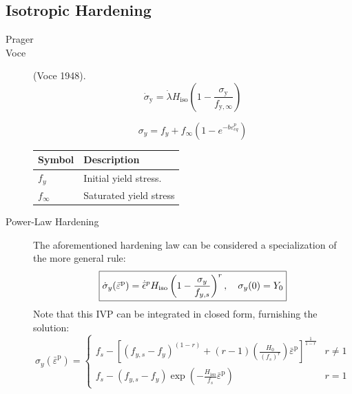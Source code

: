 \hypertarget{isotropic-hardening}{%
\subsection{Isotropic Hardening}\label{isotropic-hardening}}
\begin{description}
\item[Prager]



\item[Voce] (Voce 1948). 
  \[
  \boxed{
  \dot{\sigma}_\text{y} = \dot{\lambda} H_\text{iso}\left(1-\frac{\sigma_\text{y}}{f_{\text{y}, \infty}}\right)
  }
  \] 

\[
\sigma_{y} = f_{y} + f_{\infty}\left(1-e^{-b \varepsilon_{e q}^{p}}\right)
\]

\begin{longtable}[]{@{}ll@{}}
\toprule\noalign{}
Symbol & Description \\
\midrule\noalign{}
\endhead
\bottomrule\noalign{}
\endlastfoot
\(f_y\) & Initial yield stress. \\
\(f_\infty\) & Saturated yield stress \\
\end{longtable}


\item[Power-Law Hardening] The aforementioned hardening law can be considered a specialization of the more general rule:
\[
\boxed{
\dot{\sigma}_y(\bar{{\varepsilon}}^\mathrm{p})=\dot{\bar{\epsilon}}^p H_\text{iso}\left(1-\frac{\sigma_y}{f_{y,s}}\right)^{r}, \\
\quad \sigma_y(0) = Y_0
}
\]
Note that this IVP can be integrated in closed form, furnishing the solution: \[
\sigma_y\left(\bar{{\varepsilon}}^{\mathrm{p}}\right)
= \begin{cases}
f_{s}-\left[\left(f_{y,s}-f_{y}\right)^{(1-r)}+(r-1)\left(\frac{H_{0}}{\left(f_{s}\right)^{r}}\right) \bar{\varepsilon}^{\mathrm{p}}\right]^{\frac{1}{1-r}} & r \ne 1 \\
f_{s}-\left(f_{y,s}-f_y\right) \exp \left(-\frac{H_\text{iso}}{f_{s}} \bar{{\varepsilon}}^{\mathrm{p}}\right) & r = 1
\end{cases}
\]
\end{description}

